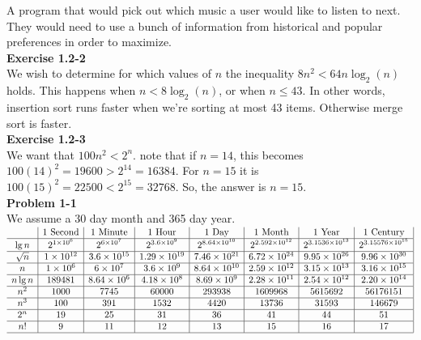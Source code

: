 \documentclass{article}
\begin{document}
A program that would pick out which music a user would like to listen to next. They would need to use a bunch of information from historical and popular preferences in order to maximize. \\

\noindent\textbf{Exercise 1.2-2}\\

We wish to determine for which values of $n$ the inequality $8n^2 < 64n \log_2(n)$ holds.  This happens when $n < 8 \log_2(n)$, or when $n \leq 43$.  In other words, insertion sort runs faster when we're sorting at most 43 items.  Otherwise merge sort is faster. \\

\noindent\textbf{Exercise 1.2-3} \\

We want that $100n^2<2^n$. note that if $n=14$, this becomes $100(14)^2=19600 > 2^14  = 16384$. For $n=15$ it is $100(15)^2 = 22500 < 2^{15} = 32768$. So, the answer is $n=15$. \\

\noindent\textbf{Problem 1-1} \\

We assume a 30 day month and 365 day year. \\

$
\begin{array}{c|c|c|c|c|c|c|c|}
&1 \mbox{ Second}&1 \mbox{ Minute} &1 \mbox{ Hour}&1 \mbox{ Day}&1 \mbox{ Month}&1 \mbox{ Year}&1 \mbox{ Century}\\
\hline
\lg n& 2^{1\times10^6}&2^{6\times10^7} &2^{3.6\times10^9} &2^{8.64\times10^{10}} &2^{2.592\times10^{12}} & 2^{3.1536\times10^{13} } & 2^{3.15576\times10^{15}} \\
\hline
\sqrt{n} &1\times10^{12} &3.6\times10^{15} &1.29\times10^{19} & 7.46\times10^{21}& 6.72\times10^{24}& 9.95\times10^{26}&9.96\times10^{30} \\
\hline
n &1\times10^6&6\times10^7 &3.6\times10^9 &8.64\times10^{10} &2.59\times10^{12}  & 3.15\times10^{13} & 3.16\times10^{15}\\
\hline
n \lg n & 189481& 8.64\times10^6&4.18\times10^8 &8.69\times10^9 &2.28\times10^{11} & 2.54\times10^{12}&2.20\times10^{14} \\
\hline
n^2 &1000 & 7745& 60000&293938 & 1609968& 5615692& 56176151\\
\hline
n^3 & 100& 391& 1532& 4420& 13736&31593 &146679 \\
\hline
2^n & 19 & 25& 31&36 &41 & 44 &51 \\
\hline
n! & 9&11 & 12& 13& 15& 16& 17\\
\hline
\end{array}
$
\end{document}
